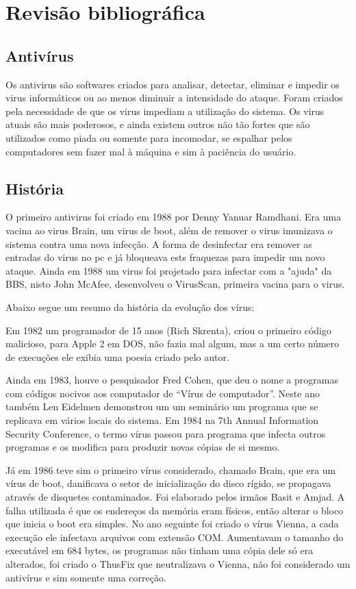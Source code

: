 
\chapter{Revisão bibliográfica}

\section{Antivírus}
Os antivirus \cite{Szor} são softwares criados para analisar, detectar, eliminar e impedir os virus informáticos ou ao menos diminuir a intensidade do ataque. Foram criados pela necessidade de que os virus impediam a utilização do sistema. Os virus atuais são mais poderosos, e ainda existem outros não tão fortes que são utilizados como piada ou somente para incomodar, se espalhar pelos computadores sem fazer mal à máquina e sim à paciência do usuário.

\section{História}
O primeiro antivirus foi criado em 1988 por Denny Yanuar Ramdhani. Era uma vacina ao virus Brain, um virus de boot, além de remover o virus imunizava o sistema contra uma nova infecção. A forma de desinfectar era remover as entradas do virus no pc e já bloqueava ests fraquezas para impedir um novo ataque. Ainda em 1988 um virus foi projetado para infectar com a "ajuda" da BBS, nisto John McAfee, desenvolveu o VirusScan, primeira vacina para o virus.

	Abaixo segue um resumo da história da evolução dos vírus:
	
	Em 1982 um programador de 15 anos (Rich Skrenta), criou o primeiro código malicioso, para Apple 2 em DOS, não fazia mal algum, mas a um certo número de execuções ele exibia uma poesia criado pelo autor.
	
	
	Ainda em 1983, houve o pesquisador Fred Cohen, que deu o nome a programas com códigos nocivos aos computador de “Vírus de computador”. Neste ano também Len Eidelmen demonstrou um um seminário um programa que se replicava em vários locais do sistema. Em 1984 na 7th Annual Information Security Conference, o termo vírus passou para programa que infecta outros programas e os modifica para produzir novas cópias de si mesmo. 
	
	
	Já em 1986 teve sim o primeiro vírus considerado, chamado Brain, que era um vírus de boot, danificava o setor de inicialização do disco rígido, se propagava através de disquetes contaminados. Foi elaborado pelos irmãos Basit e Amjad. A falha utilizada é que os endereços da memória eram físicos, então alterar o bloco que inicia o boot era simples. No ano seguinte foi criado o vírus Vienna, a cada execução ele infectava arquivos com extensão COM. Aumentavam o tamanho do executável em 684 bytes, os programas não tinham uma cópia dele só era alterados, foi criado o ThusFix que neutralizava o Vienna, não foi considerado um antivírus e sim somente uma correção.


